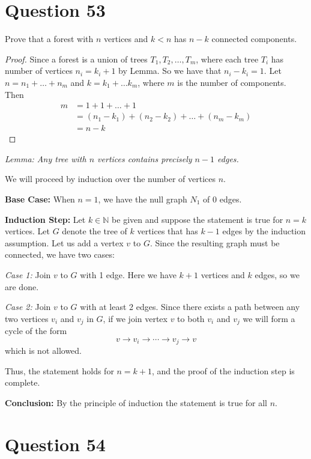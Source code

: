 \documentclass[11pt, oneside]{article}   	%
\begin{document}
\section*{Question 53}

Prove that a forest with $n$ vertices and $k<n$ has $n-k$ connected components. 
\begin{proof}

Since a forest is a union of trees $T_1, T_2, \ldots , T_m$, where each tree $T_i$ has number of vertices $n_i = k_i +1$ by Lemma. So we have that $n_i-k_i = 1$. Let $n=n_1+ \ldots + n_m$ and  $k = k_1 + \ldots k_m$, where $m$ is the number of components. Then
\begin{align*}
	m & = 1 + 1 + \ldots + 1 \\
	& = (n_1-k_1) + (n_2 - k_2) + \ldots + (n_m - k_m) \\
	& = n-k
\end{align*}
\end{proof}

\emph{Lemma: Any tree with $n$ vertices contains precisely $n-1$ edges.}

We will proceed by induction over the number of vertices $n$.

\textbf{Base Case:} When $n=1$, we have the null graph $N_1$ of 0 edges.

\textbf{Induction Step:} Let $k \in \mathbb{N}$ be given and suppose the statement is true for $n=k$ vertices. Let $G$ denote the tree of $k$ vertices that has $k-1$ edges by the induction assumption. Let us add a vertex $v$ to $G$. Since the resulting graph must be connected, we have two cases:

\emph{Case 1:} Join $v$ to $G$ with 1 edge. Here we have $k+1$ vertices and $k$ edges, so we are done.

\emph{Case 2:} Join $v$ to $G$ with at least 2 edges. Since there exists a path between any two vertices $v_i$ and $v_j$ in $G$, if we join vertex $v$ to both $v_i$ and $v_j$ we will form a cycle of the form
$$v\rightarrow v_i\rightarrow \cdots \rightarrow v_j \rightarrow v$$
which is not allowed.

Thus, the statement holds for $n=k+1$, and the proof of the induction step is complete.

\textbf{Conclusion:} By the principle of induction the statement is true for all $n$.



\section*{Question 54}
\end{document}
